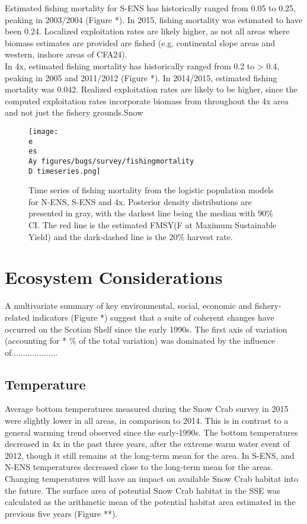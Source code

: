 \documentclass[paper=a4, fontsize=11pt]{article}
\newcommand{\D}{.}
\newcommand{\e}{\string~/ecomod_data/}   %
\newcommand{\es}{snowcrab/}
\newcommand{\Ay}{assessments/2015/}
\begin{document}
Estimated fishing mortality for S-ENS has historically ranged from 0.05 to 0.25, peaking in 2003/2004 (Figure *). In 2015, fishing mortality was estimated to have been 0.24. Localized exploitation rates are likely higher, as not all areas where biomass estimates are provided are fished (e.g. continental slope areas and western, inshore areas of CFA24).\\

In 4x, estimated fishing mortality has historically ranged from 0.2 to > 0.4, peaking in 2005 and 
2011/2012 (Figure *). In 2014/2015, estimated fishing mortality was 0.042. Realized exploitation rates are likely to be higher, since the computed exploitation rates incorporate biomass from throughout the 4x area and not just the fishery grounds.Snow

\begin{figure}[ht]
    \centering
    \texttt{[image: \\e \\es \\Ay figures/bugs/survey/fishingmortality\\D timeseries.png]}
    \caption{Time series of fishing mortality from the logistic population models for N-ENS, S-ENS and 4x. Posterior density distributions are presented in gray, with the darkest line being the median with 90\% CI. The red line is the estimated FMSY(F at Maximum Sustainable Yield) and the dark-dashed line is the 20\% harvest rate.}
\end{figure}
\clearpage

\section{Ecosystem Considerations}
A multivariate summary of key environmental, social, economic and fishery-related indicators (Figure *) suggest that a suite of coherent changes have occurred on the Scotian Shelf since the early 1990s. The first axis of variation (accounting for * \% of the total variation) was dominated by the influence of....................

\subsection{Temperature}
Average bottom temperatures measured during the Snow Crab survey in 2015 were slightly lower in all areas, in comparison to 2014. This is in contrast to a general warming trend observed since the early-1990s. The bottom temperatures decreased in 4x in the past three years, after the extreme warm water event of 2012, though it still remains at the long-term mean for the area. In S-ENS, and N-ENS temperatures decreased close to the long-term mean for the areas. Changing temperatures will have an impact on available Snow Crab habitat into the future. The surface area of potential Snow Crab habitat in the SSE was calculated as the arithmetic mean of the potential habitat area estimated in the previous five years (Figure **). 
\end{document}
